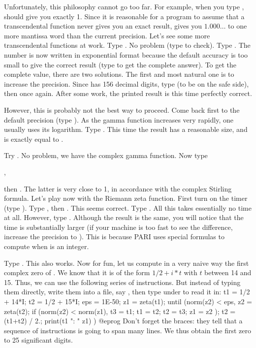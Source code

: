Unfortunately, this philosophy cannot go too far. For example, when you
type ,  should give you exactly 1. Since it is reasonable for
a program to assume that a transcendental function never gives you an exact
result,  gives you $1.000\dots$ to one more mantissa word than the current
precision.
\medskip
Let's see some more transcendental functions at work. Type
. No problem (type  to check). Type .
The number is now written in exponential format because the default
accuracy is too small to give the correct result (type  to get the
complete answer).
To get the complete value, there are two solutions. The first and most natural
one is to increase the precision. Since  has 156 decimal
digits, type  (to be on the safe side), then 
once again. After some work, the printed result is this time perfectly
correct.

However, this is probably not the best way to proceed. Come back first to the
default precision (type ). As the gamma function increases
very rapidly, one usually uses its logarithm. Type . This
time the result has a reasonable size, and is exactly equal to .

Try . No problem, we have the complex gamma function.
Now type

,

\noindent then . The latter is very close to 1, in accordance
with the complex Stirling formula. \smallskip
%
Let's play now with the Riemann zeta function. First turn on the timer (type
\kbd{\#}). Type , then . This seems correct. Type
. All this takes essentially no time at all. However, type
. Although the result is the same, you will notice that the
time is substantially larger (if your machine is too fast to see the
difference, increase the precision to ). This is because PARI
uses special formulas to compute  when  is an integer.

Type . This also works. Now for fun, let us compute in a
very naive way the first complex zero of . We know that it is
of the form $1/2 + i*t$ with $t$ between 14 and 15. Thus, we can use the
following series of instructions. But instead of typing them directly, write
them into a file, say , then type  under
 to read it in:
\bprog
  {
    t1 = 1/2 + 14*I;
    t2 = 1/2 + 15*I; eps = 1E-50;
    z1 = zeta(t1);
    until (norm(z2) < eps,
      z2 = zeta(t2);
      if (norm(z2) < norm(z1),
        t3 = t1; t1 = t2; t2 = t3; z1 = z2
      );
      t2 = (t1+t2) / 2.;
      print(t1 ": " z1)
    )
  }
@eprog\noindent
Don't forget the braces: they tell  that a sequence of instructions
is going to span many lines. We thus obtain the first zero to 25 significant
digits.


